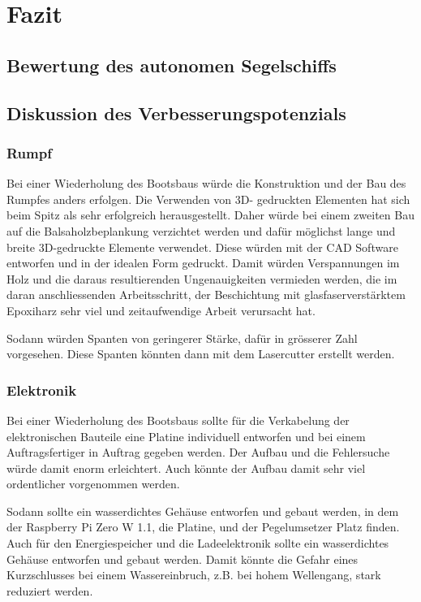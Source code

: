 

\chapter{Fazit}
\label{chap:fazit}


\section{Bewertung des autonomen Segelschiffs}




\section{Diskussion des Verbesserungspotenzials}
\subsection{Rumpf}
Bei einer Wiederholung des Bootsbaus würde die Konstruktion und der Bau des Rumpfes anders erfolgen. Die Verwenden von 3D- gedruckten Elementen hat sich beim Spitz als sehr erfolgreich herausgestellt. Daher würde bei einem zweiten Bau auf die Balsaholzbeplankung verzichtet werden und dafür möglichst lange und breite 3D-gedruckte Elemente verwendet. Diese würden mit der CAD Software entworfen und in der idealen Form gedruckt. Damit  würden Verspannungen im Holz und die daraus resultierenden Ungenauigkeiten  vermieden werden, die im daran anschliessenden Arbeitsschritt, der Beschichtung mit glasfaserverstärktem Epoxiharz sehr viel und zeitaufwendige Arbeit verursacht hat.

Sodann würden Spanten von geringerer Stärke, dafür in grösserer Zahl vorgesehen. Diese Spanten könnten dann mit dem Lasercutter erstellt werden.  
\subsection{Elektronik}
Bei einer Wiederholung des Bootsbaus sollte für die Verkabelung der elektronischen Bauteile eine Platine individuell entworfen und bei einem Auftragsfertiger in Auftrag gegeben werden. Der Aufbau und die Fehlersuche würde damit enorm erleichtert. Auch könnte der Aufbau damit sehr viel ordentlicher vorgenommen werden.

Sodann sollte ein wasserdichtes Gehäuse entworfen und gebaut werden, in dem der Raspberry Pi Zero W 1.1, die Platine, und der Pegelumsetzer Platz finden. Auch für den Energiespeicher und die Ladeelektronik sollte ein wasserdichtes Gehäuse entworfen und gebaut werden. Damit könnte die Gefahr eines Kurzschlusses bei einem Wassereinbruch, z.B. bei hohem Wellengang, stark reduziert werden.
